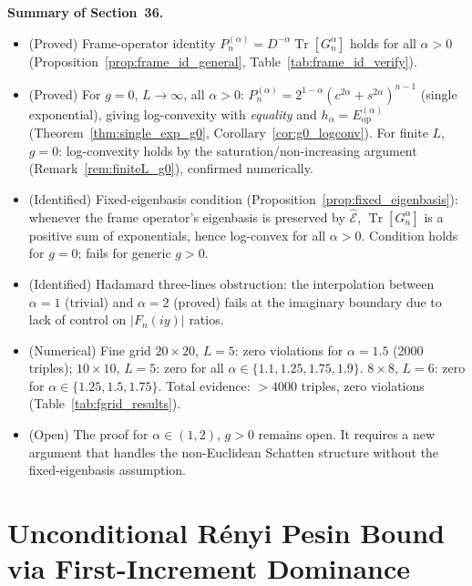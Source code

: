 \documentclass[12pt,a4paper]{article}
\begin{document}
\bigskip
\noindent\textbf{Summary of Section~36.}
\begin{itemize}
\item (Proved) Frame-operator identity $P_n^{(\alpha)}=D^{-\alpha}\operatorname{Tr}[G_n^\alpha]$
  holds for all $\alpha>0$ (Proposition~\ref{prop:frame_id_general}, Table~\ref{tab:frame_id_verify}).
\item (Proved) For $g=0$, $L\to\infty$, all $\alpha>0$:
  $P_n^{(\alpha)}=2^{1-\alpha}(c^{2\alpha}+s^{2\alpha})^{n-1}$ (single exponential),
  giving log-convexity with \emph{equality} and $h_\alpha=E_\mathrm{op}^{(\alpha)}$
  (Theorem~\ref{thm:single_exp_g0}, Corollary~\ref{cor:g0_logconv}).
  For finite $L$, $g=0$: log-convexity holds by the saturation/non-increasing argument
  (Remark~\ref{rem:finiteL_g0}), confirmed numerically.
\item (Identified) Fixed-eigenbasis condition (Proposition~\ref{prop:fixed_eigenbasis}):
  whenever the frame operator's eigenbasis is preserved by $\hat{\mathcal{E}}$,
  $\operatorname{Tr}[G_n^\alpha]$ is a positive sum of exponentials, hence log-convex
  for all $\alpha>0$.  Condition holds for $g=0$; fails for generic $g>0$.
\item (Identified) Hadamard three-lines obstruction: the
  interpolation between $\alpha=1$ (trivial) and $\alpha=2$ (proved) fails at the
  imaginary boundary due to lack of control on $|F_n(iy)|$ ratios.
\item (Numerical) Fine grid $20\times20$, $L=5$: zero violations for $\alpha=1.5$
  (2000 triples); $10\times10$, $L=5$: zero for all $\alpha\in\{1.1,1.25,1.75,1.9\}$.
  $8\times8$, $L=6$: zero for $\alpha\in\{1.25,1.5,1.75\}$.
  Total evidence: $>4000$ triples, zero violations (Table~\ref{tab:fgrid_results}).
\item (Open) The proof for $\alpha\in(1,2)$, $g>0$ remains open.
  It requires a new argument that handles the non-Euclidean Schatten structure
  without the fixed-eigenbasis assumption.
\end{itemize}

\section{Unconditional Rényi Pesin Bound via First-Increment Dominance}
\label{sec:fid}
\end{document}
